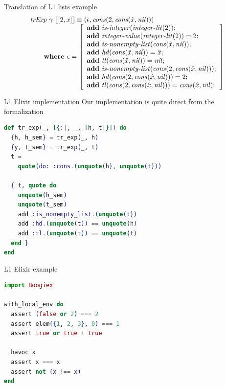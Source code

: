 \documentclass{beamer}
\begin{document}
  \begin{frame}{Translation of L1 lists example}
    \[
      \begin{array}{l}
      \mathit{trExp}~\gamma~\llbracket[2, x]\rrbracket \equiv (\epsilon, \mathit{cons}(2, \mathit{cons}(\hat{x}, \mathit{nil})))\\
      \qquad \textbf{where } \epsilon = \left[ 
      \begin{array}{l}
      \textbf{add}~\mathit{is\mbox{-}integer}(\mathit{integer\mbox{-}lit}(2));\\
      \textbf{add}~\mathit{integer\mbox{-}value}(\mathit{integer\mbox{-}lit}(2)) = 2;\\
      \textbf{add}~\mathit{is\mbox{-}nonempty\mbox{-}list}(\mathit{cons}(\hat{x}, \mathit{nil}));\\
      \textbf{add}~\mathit{hd}(\mathit{cons}(\hat{x}, \mathit{nil})) = \hat{x};\\
      \textbf{add}~\mathit{tl}(\mathit{cons}(\hat{x}, \mathit{nil})) = \mathit{nil};\\
      \textbf{add}~\mathit{is\mbox{-}nonempty\mbox{-}list}(\mathit{cons}(2, \mathit{cons}(\hat{x}, \mathit{nil})));\\
      \textbf{add}~\mathit{hd}(\mathit{cons}(2, \mathit{cons}(\hat{x}, \mathit{nil}))) = 2;\\
      \textbf{add}~\mathit{tl}(\mathit{cons}(2, \mathit{cons}(\hat{x}, \mathit{nil}))) = \mathit{cons}(\hat{x}, \mathit{nil});\\
      \end{array}
      \right]
      \end{array}
    \]
  \end{frame}
  \begin{frame}[fragile]{L1 Elixir implementation}
    Our implementation is quite direct from the formalization
    \small
    \begin{lstlisting}[language=elixir,numbers=none,frame=none]
def tr_exp(_, [{:|, _, [h, t]}]) do
  {h, h_sem} = tr_exp(_, h)
  {y, t_sem} = tr_exp(_, t)
  t = 
    quote(do: :cons.(unquote(h), unquote(t)))

  { t, quote do
    unquote(h_sem)
    unquote(t_sem)
    add :is_nonempty_list.(unquote(t))
    add :hd.(unquote(t)) == unquote(h)
    add :tl.(unquote(t)) == unquote(t)
  end }
end
    \end{lstlisting}
  \end{frame}
  \begin{frame}[fragile]{L1 Elixir example}
    \begin{lstlisting}[language=elixir,numbers=none,frame=none]
import Boogiex

with_local_env do
  assert (false or 2) === 2
  assert elem({1, 2, 3}, 0) === 1
  assert true or true + true

  havoc x
  assert x === x
  assert not (x !== x)
end
    \end{lstlisting}
  \end{frame}
\end{document}
